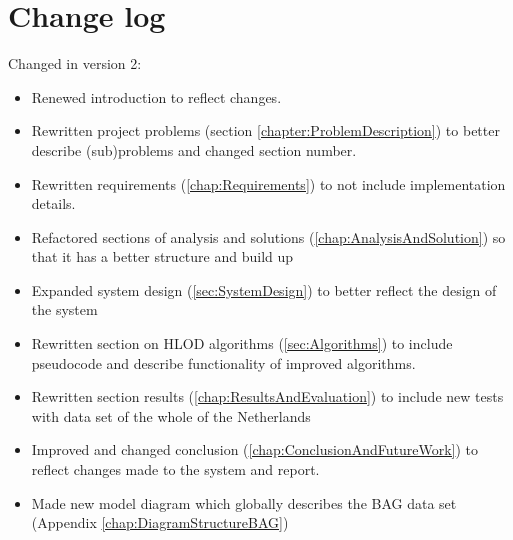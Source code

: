 \chapter{Change log}
\label{chap:changelog}
Changed in version 2:
\begin{itemize}
  \item Renewed introduction to reflect changes.
  \item Rewritten project problems (section \ref{chapter:ProblemDescription}) to better describe (sub)problems and changed section number.
  \item Rewritten requirements (\ref{chap:Requirements}) to not include implementation details.
  \item Refactored sections of analysis and solutions (\ref{chap:AnalysisAndSolution}) so that it has a better structure and build up
  \item Expanded system design (\ref{sec:SystemDesign}) to better reflect the design of the system
  \item Rewritten section on HLOD algorithms (\ref{sec:Algorithms}) to include pseudocode and describe functionality of improved algorithms.
  \item Rewritten section results (\ref{chap:ResultsAndEvaluation}) to include new tests with data set of the whole of the Netherlands
  \item Improved and changed conclusion (\ref{chap:ConclusionAndFutureWork}) to reflect changes made to the system and report.
  \item Made new model diagram which globally describes the BAG data set (Appendix \ref{chap:DiagramStructureBAG})
\end{itemize}
